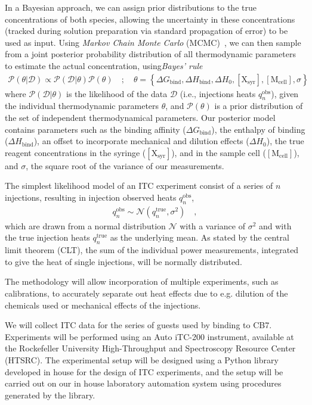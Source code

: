 \documentclass[10pt,final]{article}
\begin{document}
In a Bayesian approach, we can assign prior distributions to the true concentrations of both species, allowing the uncertainty in these concentrations (tracked during solution preparation via standard propagation of error) to be used as input.
Using \textit{Markov Chain Monte Carlo} (MCMC)~\autocite{Metropolis1953a,Hastings1970a}, we can then sample from a joint posterior probability distribution of all thermodynamic parameters to estimate the actual concentration, using\textit{Bayes' rule} 
%
\begin{align}
	\mathcal{P}\left(\theta | \mathcal{D} \right) \propto  \mathcal{P}(\mathcal{D} | \theta) \mathcal{P}\left(\theta\right) \quad;\quad \theta   =  \left\{ \Delta G_\mathrm{bind}, \Delta H_\mathrm{bind}, \Delta H_0, [\mathrm{X_{syr}}], [\mathrm{M_{cell}}], \sigma \right\}
\end{align}
%
where $\mathcal{P}(\mathcal{D}|\theta)$ is the likelihood of the data $\mathcal{D}$ (i.e., injections heats $q_n^\mathrm{obs}$), given the individual thermodynamic parameters $\theta$, and $\mathcal{P}(\theta)$ is a prior distribution of the set of independent thermodynamical parameters. Our posterior model contains parameters such as the binding affinity ($\Delta G_\mathrm{bind}$), the enthalpy of binding ($\Delta H_\mathrm{bind}$), an offset to incorporate mechanical and dilution effects ($\Delta H_0$),  the true reagent concentrations in the syringe ($[\mathrm{X_{syr}}]$), and in the sample cell ($[\mathrm{M_{cell}}]$), and $\sigma$, the square root of the variance of our measurements.

The simplest likelihood model of an ITC experiment consist of a series of $n$ injections, resulting in injection observed heats $q_n^\mathrm{obs}$,
%
\begin{align}
	q_n^\mathrm{obs} \sim \mathcal{N}(q_n^\mathrm{true}, \sigma^2) \quad ,
\end{align}
%
which are drawn from a normal distribution $\mathcal{N}$ with a variance of $\sigma^2$ and with the true injection heats $q_n^\mathrm{true}$ as the underlying mean. As stated by the central limit theorem (CLT), the sum of the individual power measurements, integrated to give the heat of single injections, will be normally distributed.

The methodology will allow incorporation of multiple experiments, such as calibrations, to accurately separate out heat effects due to e.g. dilution of the chemicals used or mechanical effects of the injections.

We will collect ITC data for the series of guests used by \textcite{Cao2013a} binding to CB7. Experiments will be performed using an Auto iTC-200 instrument, available at the Rockefeller University High-Throughput and Spectroscopy Resource Center (HTSRC). The experimental setup will be designed using a Python library~\autocite{vanRossum1995a} developed in house for the design of ITC experiments, and the setup will be carried out on our in house laboratory automation system using procedures generated by the library.
\end{document}
